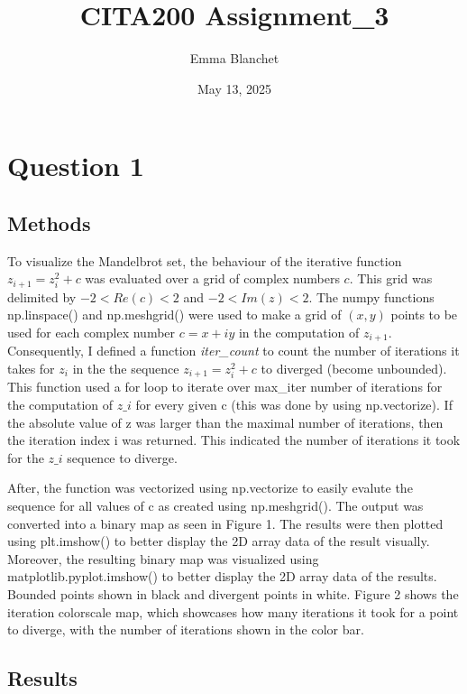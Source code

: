 \documentclass{article}
\title{\textbf{CITA200 Assignment\_3}}
\author{Emma Blanchet}
\date{May 13, 2025}
\begin{document}
\newpage

\maketitle

\section{Question 1}

\subsection{Methods}

To visualize the Mandelbrot set, the behaviour of the iterative function $z_{i + 1} = z_i^2 + c$ was evaluated over a grid of complex numbers $c$. This grid was delimited by $-2<Re(c)<2$ and $-2<Im(z)<2$. The numpy functions np.linspace() and np.meshgrid() were used to make a grid of $(x,y)$ points to be used for each complex number $c=x+iy$ in the computation of $z_{i+1}$. Consequently, I defined a function \textit{iter\_count} to count the number of iterations it takes for $z_{i}$ in the the sequence $z_{i + 1} = z_i^2 + c$ to diverged (become unbounded). This function used a for loop to iterate over max\_iter number of iterations for the computation of $z\_i$ for every given c (this was done by using np.vectorize). If the absolute value of z was larger than the maximal number of iterations, then the iteration index i was returned. This indicated the number of iterations it took for the $z\_i$ sequence to diverge. \newline

After, the function was vectorized using np.vectorize to easily evalute the sequence for all values of c as created using np.meshgrid(). The output was converted into a binary map as seen in Figure 1. The results were then plotted using plt.imshow() to better display the 2D array data of the result visually. Moreover, the resulting binary map was visualized using matplotlib.pyplot.imshow() to better display the 2D array data of the results. Bounded points shown in black and divergent points in white. Figure 2 shows the iteration colorscale map, which showcases how many iterations it took for a point to diverge, with the number of iterations shown in the color bar. 
\subsection{Results}
\end{document}
